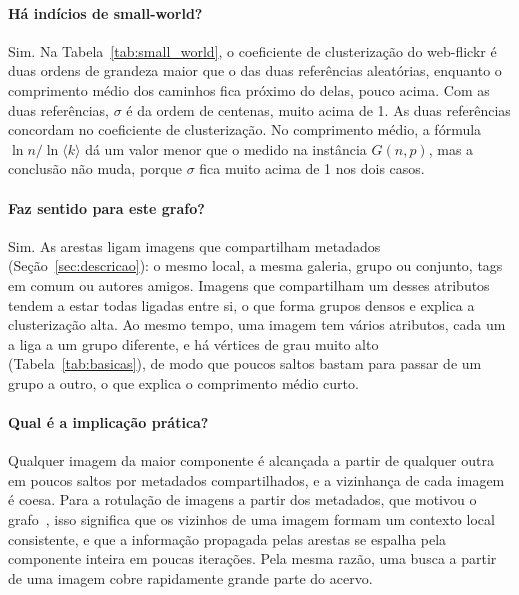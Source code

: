 \begin{table}[htbp]
  \centering
  \caption{Coeficiente de clusterização médio $C$ e comprimento médio dos caminhos $L$ do web-flickr e das duas referências aleatórias, com o coeficiente $\sigma$ calculado em relação a cada referência. No web-flickr, $C$ é exato sobre o grafo simples completo e $L$ é estimado na maior componente a partir de 1.000 fontes, com intervalo de confiança de 95\%. Na instância $G(n, p)$, $C$ é exato e $L$ é estimado da mesma forma.}
  \label{tab:small_world}
  
\end{table}

\paragraph{Há indícios de small-world?} Sim. Na Tabela~\ref{tab:small_world}, o coeficiente de clusterização do web-flickr é duas ordens de grandeza maior que o das duas referências aleatórias, enquanto o comprimento médio dos caminhos fica próximo do delas, pouco acima. Com as duas referências, $\sigma$ é da ordem de centenas, muito acima de 1. As duas referências concordam no coeficiente de clusterização. No comprimento médio, a fórmula $\ln n/\ln \langle k \rangle$ dá um valor menor que o medido na instância $G(n, p)$, mas a conclusão não muda, porque $\sigma$ fica muito acima de 1 nos dois casos.

\paragraph{Faz sentido para este grafo?} Sim. As arestas ligam imagens que compartilham metadados (Seção~\ref{sec:descricao}): o mesmo local, a mesma galeria, grupo ou conjunto, tags em comum ou autores amigos. Imagens que compartilham um desses atributos tendem a estar todas ligadas entre si, o que forma grupos densos e explica a clusterização alta. Ao mesmo tempo, uma imagem tem vários atributos, cada um a liga a um grupo diferente, e há vértices de grau muito alto (Tabela~\ref{tab:basicas}), de modo que poucos saltos bastam para passar de um grupo a outro, o que explica o comprimento médio curto.

\paragraph{Qual é a implicação prática?} Qualquer imagem da maior componente é alcançada a partir de qualquer outra em poucos saltos por metadados compartilhados, e a vizinhança de cada imagem é coesa. Para a rotulação de imagens a partir dos metadados, que motivou o grafo~\cite{mcauley2012image}, isso significa que os vizinhos de uma imagem formam um contexto local consistente, e que a informação propagada pelas arestas se espalha pela componente inteira em poucas iterações. Pela mesma razão, uma busca a partir de uma imagem cobre rapidamente grande parte do acervo.

